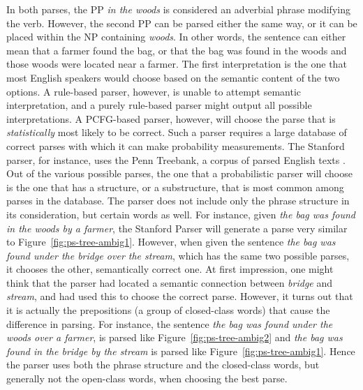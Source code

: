 \documentclass[main.tex]{subfiles}
\begin{document}
In both parses, the PP \textit{in the woods} is considered an adverbial phrase modifying the verb. However, the second PP can be parsed either the same way, or it can be placed within the NP containing \textit{woods}. In other words, the sentence can either mean that a farmer found the bag, or that the bag was found in the woods and those woods were located near a farmer. The first interpretation is the one that most English speakers would choose based on the semantic content of the two options. A rule-based parser, however, is unable to attempt semantic interpretation, and a purely rule-based parser might output all possible interpretations. A PCFG-based parser, however, will choose the parse that is \textit{statistically} most likely to be correct. Such a parser requires a large database of correct parses with which it can make probability measurements. The Stanford parser, for instance, uses the Penn Treebank, a corpus of parsed English texts \citep{marcus:1993}. Out of the various possible parses, the one that a probabilistic parser will choose is the one that has a structure, or a substructure, that is most common among parses in the database. The parser does not include only the phrase structure in its consideration, but certain words as well. For instance, given \textit{the bag was found in the woods by a farmer}, the Stanford Parser will generate a parse very similar to Figure~\ref{fig:ps-tree-ambig1}. However, when given the sentence \textit{the bag was found under the bridge over the stream}, which has the same two possible parses, it chooses the other, semantically correct one. At first impression, one might think that the parser had located a semantic connection between \textit{bridge} and \textit{stream}, and had used this to choose the correct parse. However, it turns out that it is actually the prepositions (a group of closed-class words) that cause the difference in parsing. For instance, the sentence \textit{the bag was found under the woods over a farmer}, is parsed like Figure~\ref{fig:ps-tree-ambig2} and \textit{the bag was found in the bridge by the stream} is parsed like Figure~\ref{fig:ps-tree-ambig1}. Hence the parser uses both the phrase structure and the closed-class words, but generally not the open-class words, when choosing the best parse.
\end{document}
